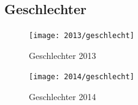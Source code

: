 \documentclass[11pt]{scrartcl}
\begin{document}
\subsection{Geschlechter}

\begin{figure}[htbp]
   \centering
   \texttt{[image: 2013/geschlecht]} %
   \caption{Geschlechter 2013}
   \label{fig:2013-geschlecht}
\end{figure}

\begin{figure}[htbp]
   \centering
   \texttt{[image: 2014/geschlecht]} %
   \caption{Geschlechter 2014}
   \label{fig:2014-geschlecht}
\end{figure}

\clearpage
{}

\end{document}

